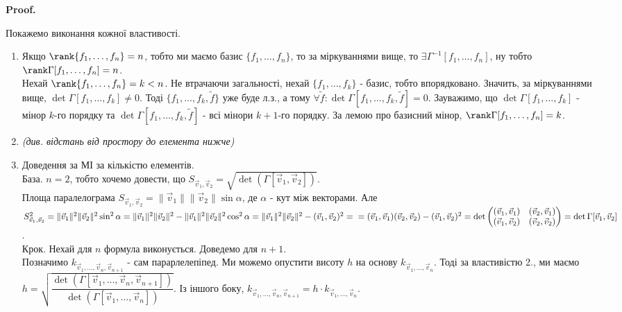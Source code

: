 \documentclass[a4paper, 10pt]{article}
\makeatletter
\theoremstyle{theoremdd}
\renewenvironment{proof}[1][Proof.\\]{\par
\pushQED{\hfill \qed}%
\normalfont \topsep6\p@\@plus6\p@\relax
\trivlist
\item\relax
{\bfseries
#1\@addpunct{.}}\hspace\labelsep\ignorespaces
}{%
\popQED\endtrivlist\@endpefalse
}
\makeatother
\begin{document}
\begin{proof}
Покажемо виконання кожної властивості.
\begin{enumerate}[wide=0pt, label={\arabic*)},topsep=-\parskip]
\item Якщо $\rank\{f_1,\dots,f_n\} = n$, тобто ми маємо базис $\{f_1,\dots,f_n\}$, то за міркуваннями вище, то $\exists \Gamma^{-1}[f_1,\dots,f_n]$, ну тобто $\rank\Gamma[f_1,\dots,f_n] = n$.\\
Нехай $\rank\{f_1,\dots,f_n\} = k < n$. Не втрачаючи загальності, нехай $\{f_1,\dots,f_k\}$ - базис, тобто впорядковано. Значить, за міркуваннями вище, $\det \Gamma[f_1,\dots,f_k] \neq 0$. Тоді $\{f_1,\dots,f_k,\tilde{f}\}$ уже буде л.з., а тому $\forall \tilde{f}: \det \Gamma[f_1,\dots,f_k,\tilde{f}] = 0$. Зауважимо, що $\det \Gamma[f_1,\dots,f_k]$ - мінор $k$-го порядку та $\det \Gamma[f_1,\dots,f_k, \tilde{f}]$ - всі мінори $k+1$-го порядку. За лемою про базисний мінор, $\rank \Gamma[f_1,\dots,f_n] = k$.
\item \textit{(див. відстань від простору до елемента нижче)}
\item Доведення за МІ за кількістю елементів.\\
База. $n = 2$, тобто хочемо довести, що $S_{\vec{v}_1,\vec{v}_2} = \sqrt{\det(\Gamma[\vec{v}_1,\vec{v}_2])}$.\\
Площа паралелограма $S_{\vec{v}_1,\vec{v}_2} = \| \vec{v}_1 \| \| \vec{v}_2 \| \sin \alpha$, де $\alpha$ - кут між векторами. Але\\
$S^2_{\vec{v}_1,\vec{v}_2} = \| \vec{v}_1 \|^2 \| \vec{v}_2 \|^2 \sin^2 \alpha = \| \vec{v}_1 \|^2 \| \vec{v}_2 \|^2 - \| \vec{v}_1 \|^2 \| \vec{v}_2 \|^2 \cos^2 \alpha = \| \vec{v}_1 \|^2 \| \vec{v}_2 \|^2 - (\vec{v}_1,\vec{v}_2)^2 = \\ = (\vec{v}_1,\vec{v}_1) (\vec{v}_2,\vec{v}_2) - (\vec{v}_1,\vec{v}_2)^2 = \det \begin{pmatrix}
(\vec{v}_1,\vec{v}_1) & (\vec{v}_2,\vec{v}_1) \\
(\vec{v}_1,\vec{v}_2) & (\vec{v}_2,\vec{v}_2)
\end{pmatrix} = \det \Gamma[\vec{v}_1,\vec{v}_2]$.
\\
Крок. Нехай для $n$ формула виконується. Доведемо для $n+1$.\\
Позначимо $k_{\vec{v}_1,\dots,\vec{v}_n,\vec{v}_{n+1}}$ - сам парарлелепіпед. Ми можемо опустити висоту $h$ на основу $k_{\vec{v}_1,\dots,\vec{v}_n}$. Тоді за властивістю 2., ми маємо $h = \sqrt{\dfrac{\det(\Gamma[\vec{v}_1,\dots,\vec{v}_n,\vec{v}_{n+1}])}{\det(\Gamma[\vec{v}_1,\dots,\vec{v}_n])}}$. Із іншого боку, $k_{\vec{v}_1,\dots,\vec{v}_n,\vec{v}_{n+1}} = h \cdot k_{\vec{v}_1,\dots,\vec{v}_n}$.\\

\end{enumerate}
\end{proof}
\end{document}
